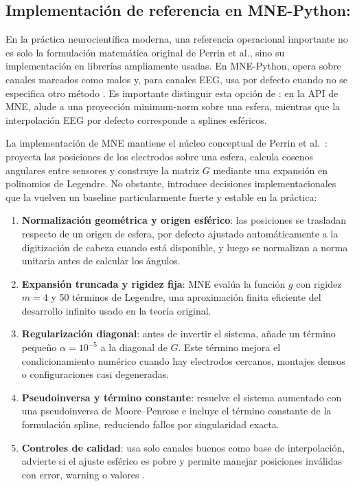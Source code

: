 \subsection{Implementación de referencia en MNE-Python: }

En la práctica neurocientífica moderna, una referencia operacional importante no es solo la formulación matemática original de Perrin et al., sino su implementación en librerías ampliamente usadas. En MNE-Python,  opera sobre canales marcados como malos y, para canales EEG, usa por defecto  cuando no se especifica otro método \cite{gramfort2013meg, gramfort_mne_software_2014, mne_interpolate_bads_docs}. Es importante distinguir esta opción de : en la API de MNE,  alude a una proyección minimum-norm sobre una esfera, mientras que la interpolación EEG por defecto corresponde a splines esféricos.

La implementación  de MNE mantiene el núcleo conceptual de Perrin et al.~\cite{perrin_spherical_1989}: proyecta las posiciones de los electrodos sobre una esfera, calcula cosenos angulares entre sensores y construye la matriz $G$ mediante una expansión en polinomios de Legendre. No obstante, introduce decisiones implementacionales que la vuelven un baseline particularmente fuerte y estable en la práctica:
\begin{enumerate}
  \item \textbf{Normalización geométrica y origen esférico}: las posiciones se trasladan respecto de un origen de esfera, por defecto ajustado automáticamente a la digitización de cabeza cuando está disponible, y luego se normalizan a norma unitaria antes de calcular los ángulos.
  \item \textbf{Expansión truncada y rigidez fija}: MNE evalúa la función $g$ con rigidez $m=4$ y 50 términos de Legendre, una aproximación finita eficiente del desarrollo infinito usado en la teoría original.
  \item \textbf{Regularización diagonal}: antes de invertir el sistema, añade un término pequeño $\alpha=10^{-5}$ a la diagonal de $G$. Este término mejora el condicionamiento numérico cuando hay electrodos cercanos, montajes densos o configuraciones casi degeneradas.
  \item \textbf{Pseudoinversa y término constante}: resuelve el sistema aumentado con una pseudoinversa de Moore--Penrose e incluye el término constante de la formulación spline, reduciendo fallos por singularidad exacta.
  \item \textbf{Controles de calidad}: usa solo canales buenos como base de interpolación, advierte si el ajuste esférico es pobre y permite manejar posiciones inválidas con error, warning o valores .
\end{enumerate}

